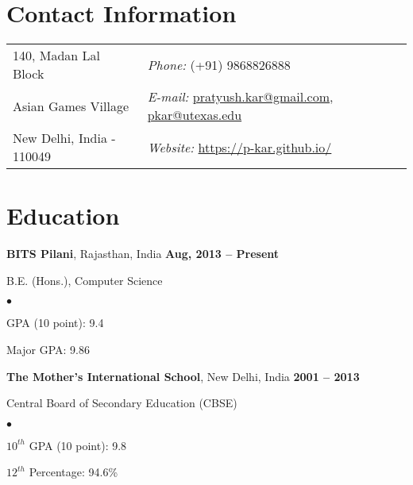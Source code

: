 \documentclass[margin,line]{res}
\newenvironment{list1}{
  \begin{list}{\ding{113}}{%
      \setlength{\itemsep}{0in}
      \setlength{\parsep}{0in} \setlength{\parskip}{0in}
      \setlength{\topsep}{0in} \setlength{\partopsep}{0in} 
      \setlength{\leftmargin}{0.17in}}}{\end{list}}
\newenvironment{list2}{
  \begin{list}{$\bullet$}{%
      \setlength{\itemsep}{0in}
      \setlength{\parsep}{0in} \setlength{\parskip}{0in}
      \setlength{\topsep}{0in} \setlength{\partopsep}{0in} 
      \setlength{\leftmargin}{0.2in}}}{\end{list}}
\begin{document}

\begin{resume}
\section{\sc Contact Information}
\vspace{.05in}
\begin{tabular}{@{}p{2in}p{4in}}
140, Madan Lal Block        & {\it Phone:} (+91) 9868826888 \\            
Asian Games Village         & {\it E-mail:} \href{mailto:pratyush.kar@gmail.com}{pratyush.kar@gmail.com}, \href{mailto:pkar@utexas.edu}{pkar@utexas.edu} \\         
New Delhi, India - 110049   & {\it Website:} \href{https://p-kar.github.io/}{https://p-kar.github.io/} \\    
\end{tabular}



\section{\sc Education}
{\bf BITS Pilani}, Rajasthan, India \hfill {\bf Aug, 2013 -- Present}\\
\vspace*{-.1in}
\begin{list1}
\item[] B.E. (Hons.), Computer Science
\begin{list2}
\vspace*{.05in}
\item GPA (10 point): 9.4
\item Major GPA: 9.86
\end{list2}
\vspace*{.05in}
\end{list1}

{\bf The Mother's International School}, New Delhi, India \hfill {\bf 2001 -- 2013}\\
\vspace*{-.1in}
\begin{list1}
\item[] Central Board of Secondary Education (CBSE)
\begin{list2}
\vspace*{.05in}
\item $10^{th}$ GPA (10 point): 9.8
\item $12^{th}$ Percentage: 94.6\%
\end{list2}
\vspace*{.05in}
\end{list1}



\end{resume}
\end{document}
